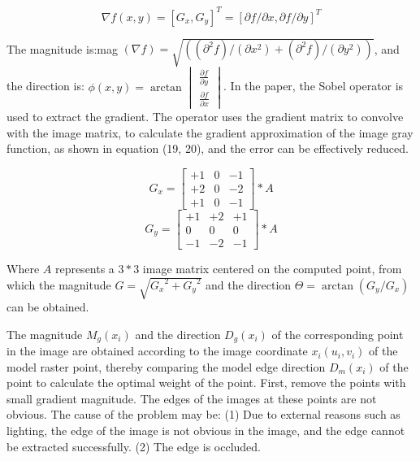 \documentclass{cta-author}
\begin{document}
\begin{equation}\label{eq18}
  \nabla f(x,y)=[G_x,G_y ]^T=[\partial f/\partial x,\partial f/\partial y]^T
\end{equation}

The magnitude is:mag $(\nabla f)=\sqrt{((\partial^{2} f)/(\partial x^{2} )+(\partial^{2} f)/(\partial y^{2} ))}$, and the direction is: 
$\phi(x,y)=\arctan \begin{vmatrix} 
  \frac{\partial f}{\partial y} \\
  \frac{\partial f}{\partial x}
  \end{vmatrix}   $. In the paper, the Sobel operator is used to extract the gradient. The operator uses the gradient matrix to convolve with the image matrix, to calculate the gradient approximation of the image gray function, as shown in equation (19, 20), and the error can be effectively reduced.
 
  \begin{equation}\label{eq19}
    G_x= \begin{bmatrix} 
      +1 & 0 & -1\\
      +2 & 0 & -2\\
      +1 & 0 & -1
        \end{bmatrix}*A 
  \end{equation}
  \begin{equation}\label{eq20}
    G_y= \begin{bmatrix} 
      +1 & +2 & +1\\
      0 & 0 & 0\\
      -1 & -2 & -1
        \end{bmatrix}*A 
  \end{equation}

  Where $A$ represents a $3*3$ image matrix centered on the computed point, from which the magnitude $G=\sqrt{{G_x}^2+{G_y}^2}$ and the direction $\Theta=\arctan(G_y/G_x)$ can be obtained.
  
  The magnitude $M_g(x_i)$ and the direction $D_g(x_i)$  of the corresponding point in the image are obtained according to the image coordinate $x_i(u_i,v_i)$  of the model raster point, thereby comparing the model edge direction $D_m(x_i)$  of the point to calculate the optimal weight of the point. First, remove the points with small gradient magnitude. The edges of the images at these points are not obvious. The cause of the problem may be: 
  (1) Due to external reasons such as lighting, the edge of the image is not obvious in the image, and the edge cannot be extracted successfully.
  (2) The edge is occluded. 
\end{document}

